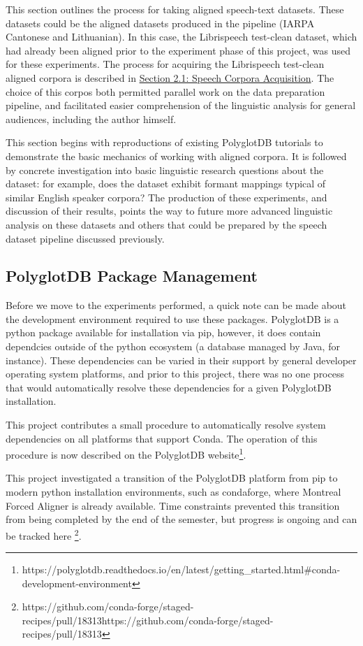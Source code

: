 \documentclass[11pt]{article}
\begin{document}
This section outlines the process for taking aligned speech-text datasets. These datasets could be the aligned datasets produced in the pipeline (IARPA Cantonese and Lithuanian). In this case, the Librispeech test-clean dataset, which had already been aligned prior to the experiment phase of this project, was used for these experiments. The process for acquiring the Librispeech test-clean aligned corpora is described in \hyperlink{section.21}{Section 2.1: Speech Corpora Acquisition}. The choice of this corpos both permitted parallel work on the data preparation pipeline, and facilitated easier comprehension of the linguistic analysis for general audiences, including the author himself.

This section begins with reproductions of existing PolyglotDB tutorials to demonstrate the basic mechanics of working with aligned corpora. It is followed by concrete investigation into basic linguistic research questions about the dataset: for example, does the dataset exhibit formant mappings typical of similar English speaker corpora? The production of these experiments, and discussion of their results, points the way to future more advanced linguistic analysis on these datasets and others that could be prepared by the speech dataset pipeline discussed previously.

\subsection{PolyglotDB Package Management}

Before we move to the experiments performed, a quick note can be made about the development environment required to use these packages. PolyglotDB is a python package available for installation via pip, however, it does contain dependcies outside of the python ecosystem (a database managed by Java, for instance). These dependencies can be varied in their support by general developer operating system platforms, and prior to this project, there was no one process that would automatically resolve these dependencies for a given PolyglotDB installation.

This project contributes a small procedure to automatically resolve system dependencies on all platforms that support Conda. The operation of this procedure is now described on the PolyglotDB website\footnote{https://polyglotdb.readthedocs.io/en/latest/getting\_started.html\#conda-development-environment}.

This project investigated a transition of the PolyglotDB platform from pip to modern python installation environments, such as condaforge, where Montreal Forced Aligner is already available. Time constraints prevented this transition from being completed by the end of the semester, but progress is ongoing and can be tracked here \footnote{https://github.com/conda-forge/staged-recipes/pull/18313https://github.com/conda-forge/staged-recipes/pull/18313}.
\end{document}
